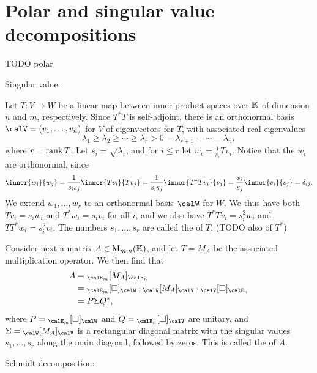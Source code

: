 \section{Polar and singular value decompositions}

TODO polar

Singular value:

Let $T \colon V \to W$ be a linear map between inner product spaces over $\mathbb{K}$ of dimension $n$ and $m$, respectively. Since $T^*T$ is self-adjoint, there is an orthonormal basis $\calV = (v_1,\ldots,v_n)$ for $V$ of eigenvectors for $T$, with associated real eigenvalues
%
\begin{equation*}
    \lambda_1
        \geq \lambda_2
        \geq \cdots
        \geq \lambda_r
        > 0
        = \lambda_{r+1}
        = \cdots
        = \lambda_n,
\end{equation*}
%
where $r = \operatorname{rank} T$. Let $s_i = \sqrt{\lambda_i}$, and for $i \leq r$ let $w_i = \tfrac{1}{s_i}Tv_i$. Notice that the $w_i$ are orthonormal, since
%
\begin{equation*}
    \inner{w_i}{w_j}
        = \frac{1}{s_i s_j} \inner{Tv_i}{Tv_j}
        = \frac{1}{s_i s_j} \inner{T^*Tv_i}{v_j}
        = \frac{s_i}{s_j} \inner{v_i}{v_j}
        = \delta_{ij}.
\end{equation*}
%
We extend $w_1,\ldots,w_r$ to an orthonormal basis $\calW$ for $W$. We thus have both $Tv_i = s_i w_i$ and $T^*w_i = s_i v_i$ for all $i$, and we also have $T^*Tv_i = s_i^2 w_i$ and $TT^*w_i = s_i^2 v_i$. The numbers $s_1, \ldots, s_r$ are called the  of $T$. (TODO also of $T^*$)

Consider next a matrix $A \in \mathrm{M}_{m,n}(\mathbb{K})$, and let $T = M_A$ be the associated multiplication operator. We then find that
%
\begin{align*}
    A
        &= \mr{\calE_m}{M_A}{\calE_n} \\
        &= \basischangemat{\calE_m}{\calW} \cdot \mr{\calW}{M_A}{\calV} \cdot \basischangemat{\calV}{\calE_n} \\
        &= P \Sigma Q^*,
\end{align*}
%
where $P = \basischangemat{\calE_m}{\calW}$ and $Q = \basischangemat{\calE_n}{\calV}$ are unitary, and $\Sigma = \mr{\calW}{M_A}{\calV}$ is a rectangular diagonal matrix with the singular values $s_1, \ldots, s_r$ along the main diagonal, followed by zeros. This is called the  of $A$.


Schmidt decomposition:

